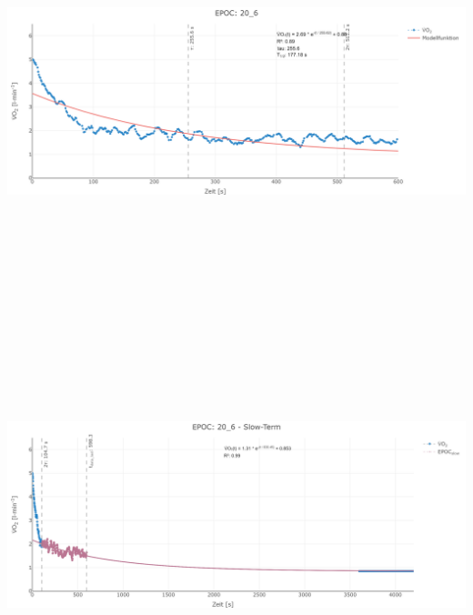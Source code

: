 \documentclass[
  letterpaper,
  DIV=11]{scrartcl}
\begin{document}
\includegraphics[width=11.45833in,height=4.6875in]{images/20_6_tau.png}
\includegraphics[width=11.45833in,height=4.6875in]{images/20_6_slow.png}
\end{document}
